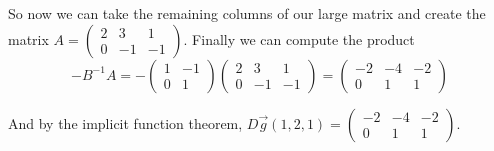 \documentclass{article}
\begin{document}
\begin{enumerate}
So now we can take the remaining columns of our large matrix and create the matrix $A=\begin{pmatrix}2&3&1\\0&-1&-1\end{pmatrix}$. Finally we can compute the product $$-B^{-1}A=-\begin{pmatrix}1&-1\\0&1\end{pmatrix}\begin{pmatrix}2&3&1\\0&-1&-1\end{pmatrix}=\begin{pmatrix}-2&-4&-2\\0&1&1\end{pmatrix}$$

And by the implicit function theorem, $D\vec g(1,2,1)=\begin{pmatrix}-2&-4&-2\\0&1&1\end{pmatrix}$.

\end{enumerate}
\end{document}
